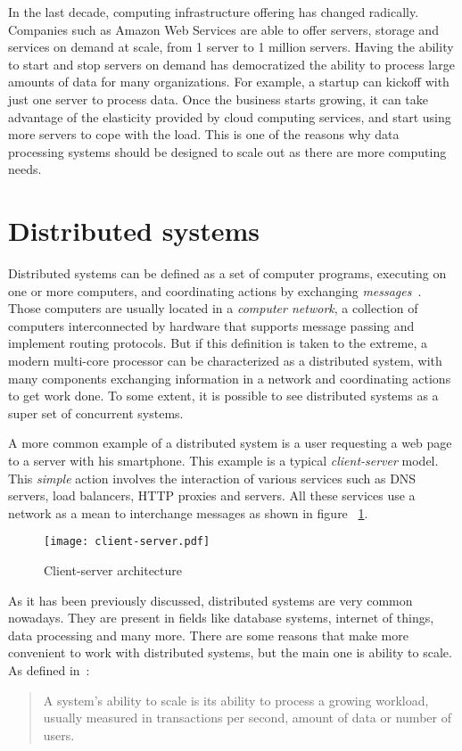 In the last decade, computing infrastructure offering has changed radically.
Companies such as Amazon Web Services are able to offer servers, storage and
services on demand at scale, from 1 server to 1 million servers. Having the
ability to start and stop servers on demand has democratized the ability to
process large amounts of data for many organizations. For example, a startup can
kickoff with just one server to process data. Once the business starts growing,
it can take advantage of the elasticity provided by cloud computing services,
and start using more servers to cope with the load. This is one of the reasons why
data processing systems should be designed to scale out as there are more
computing needs.

\section{Distributed systems}
\label{subsection:distsys}

Distributed systems can be defined as a set of computer programs,
executing on one or more computers, and coordinating actions by
exchanging \textit{messages}~\cite{GuideReliable}. Those computers are
usually located in a \textit{computer network}, a collection of
computers interconnected by hardware that supports message passing and
implement routing protocols. But if this definition is taken to the
extreme, a modern multi-core processor can be characterized as a
distributed system, with many components exchanging information in a
network and coordinating actions to get work done. To some extent, it
is possible to see distributed systems as a super set of concurrent
systems.

A more common example of a distributed system is a user requesting a web page to
a server with his smartphone. This example is a typical \textit{client-server}
model. This \textit{simple} action involves the interaction of various services
such as DNS servers, load balancers, \acf{HTTP} proxies and servers. All these
services use a network as a mean to interchange messages as shown in figure
~\ref{fig:client-server}.

\begin{figure}[!h]
\begin{center}
\texttt{[image: client-server.pdf]}
\caption{Client-server architecture}
\label{fig:client-server}
\end{center}
\end{figure}

As it has been previously discussed, distributed systems are very
common nowadays. They are present in fields like database systems,
internet of things, data processing and many more. There are some
reasons that make more convenient to work with distributed systems,
but the main one is ability to scale. As defined
in~\cite{cloudadmin}:
%
\begin{quote}
  A system's ability to scale is its ability to process a growing workload,
  usually measured in transactions per second, amount of data or number of
  users.
\end{quote}

